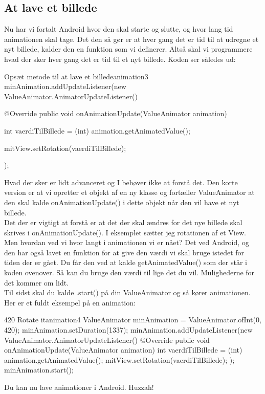 \subsection{At lave et billede}
Nu har vi fortalt Android hvor den skal starte og slutte, og hvor lang tid animationen skal tage. Det den så gør er at hver gang det er tid til at udregne et nyt billede, kalder den en funktion som vi definerer. Altså skal vi programmere hvad der sker hver gang det er tid til et nyt billede. Koden ser således ud:
\begin{JavaCode}{Opsæt metode til at lave et billede}{animation3}
	minAnimation.addUpdateListener(new ValueAnimator.AnimatorUpdateListener() {
		@Override
		public void onAnimationUpdate(ValueAnimator animation) {
			int vaerdiTilBillede = (int) animation.getAnimatedValue();
			
			mitView.setRotation(vaerdiTilBillede);
		}
	});
\end{JavaCode}
Hvad der sker er lidt advanceret og I behøver ikke at forstå det. Den korte version er at vi opretter et objekt af en ny klasse og fortæller ValueAnimator at den skal kalde onAnimationUpdate() i dette objekt når den vil have et nyt billede.\\
Det der er vigtigt at forstå er at det der skal ændres for det nye billede skal skrives i onAnimationUpdate(). I eksemplet sætter jeg rotationen af et View. \\
Men hvordan ved vi hvor langt i animationen vi er nået? Det ved Android, og den har også lavet en funktion for at give den værdi vi skal bruge istedet for tiden der er gået. Du får den ved at kalde getAnimatedValue() som der står i koden ovenover. Så kan du bruge den værdi til lige det du vil. Mulighederne for det kommer om lidt. \\
Til sidst skal du kalde .start() på din ValueAnimator og så kører animationen. Her er et fuldt eksempel på en animation: 
\begin{JavaCode}{420 Rotate it}{animation4}
	ValueAnimator minAnimation = ValueAnimator.ofInt(0, 420);
	minAnimation.setDuration(1337);
	minAnimation.addUpdateListener(new ValueAnimator.AnimatorUpdateListener() {
		@Override
		public void onAnimationUpdate(ValueAnimator animation) {
			int vaerdiTilBillede = (int) animation.getAnimatedValue();
			mitView.setRotation(vaerdiTilBillede);
		}
	});
	minAnimation.start();
\end{JavaCode}
Du kan nu lave animationer i Android. Huzzah!
